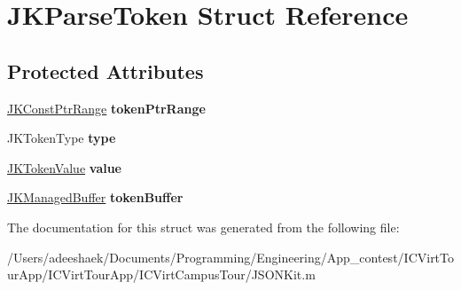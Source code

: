 \hypertarget{struct_j_k_parse_token}{\section{J\-K\-Parse\-Token Struct Reference}
\label{struct_j_k_parse_token}
}
\subsection*{Protected Attributes}
\begin{DoxyCompactItemize}
\item 
\hypertarget{struct_j_k_parse_token_adc75ff46348259be5f9da442f410c463}{\hyperlink{struct_j_k_const_ptr_range}{J\-K\-Const\-Ptr\-Range} {\bfseries token\-Ptr\-Range}}\label{struct_j_k_parse_token_adc75ff46348259be5f9da442f410c463}

\item 
\hypertarget{struct_j_k_parse_token_adb4eb4ffaaa78debafbbfcaebb19f3fe}{J\-K\-Token\-Type {\bfseries type}}\label{struct_j_k_parse_token_adb4eb4ffaaa78debafbbfcaebb19f3fe}

\item 
\hypertarget{struct_j_k_parse_token_a711ddc59ab5ecc13505e6fc197466d3a}{\hyperlink{struct_j_k_token_value}{J\-K\-Token\-Value} {\bfseries value}}\label{struct_j_k_parse_token_a711ddc59ab5ecc13505e6fc197466d3a}

\item 
\hypertarget{struct_j_k_parse_token_ab3f688fb97a6fca9644e55bfbf32978d}{\hyperlink{struct_j_k_managed_buffer}{J\-K\-Managed\-Buffer} {\bfseries token\-Buffer}}\label{struct_j_k_parse_token_ab3f688fb97a6fca9644e55bfbf32978d}

\end{DoxyCompactItemize}


The documentation for this struct was generated from the following file\-:\begin{DoxyCompactItemize}
\item 
/\-Users/adeeshaek/\-Documents/\-Programming/\-Engineering/\-App\-\_\-contest/\-I\-C\-Virt\-Tour\-App/\-I\-C\-Virt\-Tour\-App/\-I\-C\-Virt\-Campus\-Tour/J\-S\-O\-N\-Kit.\-m\end{DoxyCompactItemize}
